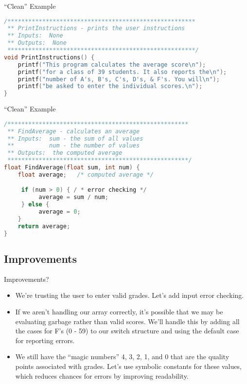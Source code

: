 \documentclass[graphics]{beamer}
\begin{document}
\begin{frame}[fragile]{``Clean'' Example}
    \begin{lstlisting}[language=C,basicstyle=\footnotesize,keywordstyle=\color{blue},commentstyle=\color{green},showstringspaces=false,stringstyle=\color{red}]
/******************************************************
 ** PrintInstructions - prints the user instructions
 ** Inputs:  None
 ** Outputs:  None
 ******************************************************/
void PrintInstructions() {
    printf("This program calculates the average score\n");
    printf("for a class of 39 students. It also reports the\n");
    printf("number of A's, B's, C's, D's, & F's. You will\n");
    printf("be asked to enter the individual scores.\n");
}
    \end{lstlisting}
\end{frame}


\begin{frame}[fragile]{``Clean'' Example}
    \begin{lstlisting}[language=C,basicstyle=\footnotesize,keywordstyle=\color{blue},commentstyle=\color{green},showstringspaces=false,stringstyle=\color{red}]
/****************************************************
 ** FindAverage - calculates an average
 ** Inputs:  sum - the sum of all values
 **          num - the number of values
 ** Outputs:  the computed average
 ****************************************************/
float FindAverage(float sum, int num) {
    float average;   /* computed average */

     if (num > 0) { / * error checking */
          average = sum / num;
     } else {
          average = 0;
    }
    return average;
}
    \end{lstlisting}
\end{frame}

\subsection{Improvements}
\begin{frame}{Improvements?}
    \begin{itemize}
        \item We're trusting the user to enter valid grades. Let's add input error checking.
        \item If we aren't handling our array correctly, it's possible that we may be evaluating garbage rather than valid scores. We'll handle this by adding all the cases for F's (0 - 59) to our switch structure and using the default case for reporting errors.
        \item We still have the ``magic numbers'' 4, 3, 2, 1, and 0 that are the quality points associated with grades. Let's use symbolic constants for these values, which reduces chances for errors by improving readability.
    \end{itemize}
\end{frame}
\end{document}

